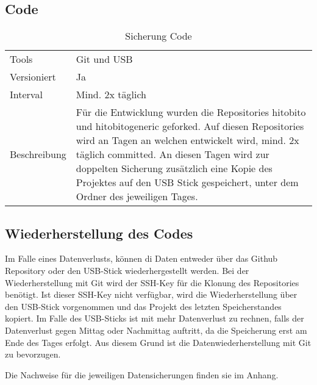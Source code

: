 \newpage

\subsection{Code}
\begin{table}[h!]
    \begin{tabular}{|L{0.4\textwidth}|L{0.5\textwidth}|}
        \hline
          \\[12pt]
        \hline
        Tools & Git und USB \\
        \hline
        Versioniert & Ja \\
        \hline
        Interval & Mind. 2x täglich \\
        \hline
        Beschreibung & Für die Entwicklung wurden die Repositories hitobito und hitobito\-generic geforked.
        Auf diesen Repositories wird an Tagen an welchen entwickelt wird, mind. 2x täglich committed. An diesen Tagen
        wird zur doppelten Sicherung zusätzlich eine Kopie des Projektes auf den USB Stick gespeichert, unter dem Ordner des jeweiligen Tages. \\
      \hline
      \end{tabular}
      \caption{Sicherung Code}
\end{table}


\subsection{Wiederherstellung des Codes}
Im Falle eines Datenverlusts, können di Daten entweder über das Github Repository oder den USB-Stick wiederhergestellt werden.
Bei der Wiederherstellung mit Git wird der SSH-Key für die Klonung des Repositories benötigt. Ist
dieser SSH-Key nicht verfügbar, wird die Wiederherstellung über den USB-Stick vorgenommen und das Projekt des letzten Speicherstandes
kopiert. Im Falle des USB-Sticks ist mit mehr Datenverlust zu rechnen, falls der Datenverlust gegen Mittag oder Nachmittag auftritt, da
die Speicherung erst am Ende des Tages erfolgt. Aus diesem Grund ist die Datenwiederherstellung mit Git zu bevorzugen.

Die Nachweise für die jeweiligen Datensicherungen finden sie im Anhang.

\newpage

